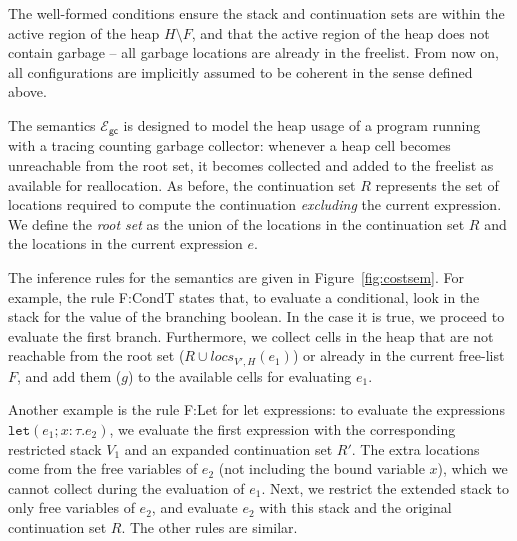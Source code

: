 \documentclass{easychair}
\newcommand{\ms}[1]{\ensuremath{\mathsf{#1}}}
\newcommand{\irl}[1]{\mathtt{#1}}
\newcounter{rule}
\newcommand{\gcSem}{\ensuremath{\mathcal{E}_{\ms{gc}}}}
\theoremstyle{definition}
\begin{document}
The well-formed conditions ensure the stack and continuation sets are within the active region
of the heap $H \setminus F$, and that
the active region of the heap does not contain garbage -- all garbage locations 
are already in the freelist. From now on, all configurations are implicitly assumed to be coherent
in the sense defined above.

The semantics \gcSem{} is designed to model the heap usage of a program running with a 
tracing counting garbage collector: whenever a heap cell becomes unreachable from the 
root set, it becomes collected and added to the freelist as available for reallocation.
As before, the continuation set $R$ represents the set of locations 
required to compute the continuation \emph{excluding} the current expression.
We define the  \emph{root set} as the union of the locations in the continuation set $R$ 
and the locations in the current expression $e$. 

The inference rules for the semantics are given in Figure~\ref{fig:costsem}.
For example, the rule F:CondT states that, to evaluate a conditional, 
look in the stack for the value of the branching boolean.
In the case it is true, we proceed to evaluate the first branch.
Furthermore, we collect cells in the heap
that are not reachable from the root set ($R \cup locs_{V',H}(e_1)$) 
or already in the current free-list
$F$, and add them ($g$) to the available cells for evaluating $e_1$. 

Another example is the rule F:Let for let expressions:
to evaluate the expressions $\irl{let}(e_1; x {:} \tau.e_2)$, we evaluate the first 
expression with the corresponding restricted stack $V_1$ and an expanded continuation set $R'$. 
The extra locations come from the free variables of $e_2$ (not including the bound variable $x$),
which we cannot collect during the evaluation of $e_1$. Next, we restrict the extended stack 
to only free variables of $e_2$, and evaluate $e_2$ with this stack and the original continuation 
set $R$. The other rules are similar. 
\end{document}
